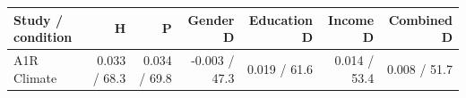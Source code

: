 
\begin{tabular}{lrrrrrr}
\toprule
Study / condition & H & P & Gender D & Education D & Income D & Combined D\\
\midrule
A1R Climate & 0.033 / 68.3 & 0.034 / 69.8 & -0.003 / 47.3 & 0.019 / 61.6 & 0.014 / 53.4 & 0.008 / 51.7\\
\bottomrule
\end{tabular}
